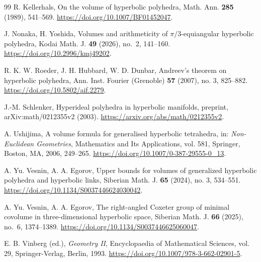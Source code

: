 \documentclass[12pt,a4paper]{article}
\theoremstyle{definition}
\begin{document}
\begin{thebibliography}{99}
R. Kellerhals,
On the volume of hyperbolic polyhedra,
Math. Ann. \textbf{285} (1989), 541--569.
\url{https://doi.org/10.1007/BF01452047}.

J. Nonaka, H. Yoshida,
Volumes and arithmeticity of \(\pi/3\)-equiangular hyperbolic polyhedra,
Kodai Math. J. \textbf{49} (2026), no.~2, 141--160.
\url{https://doi.org/10.2996/kmj49202}.

R. K. W. Roeder, J. H. Hubbard, W. D. Dunbar,
Andreev's theorem on hyperbolic polyhedra,
Ann. Inst. Fourier (Grenoble) \textbf{57} (2007), no. 3, 825--882.
\url{https://doi.org/10.5802/aif.2279}.

J.-M. Schlenker,
Hyperideal polyhedra in hyperbolic manifolds,
preprint, arXiv:math/0212355v2 (2003).
\url{https://arxiv.org/abs/math/0212355v2}.

A. Ushijima,
A volume formula for generalised hyperbolic tetrahedra,
in: \emph{Non-Euclidean Geometries}, Mathematics and Its Applications, vol. 581,
Springer, Boston, MA, 2006, 249--265.
\url{https://doi.org/10.1007/0-387-29555-0_13}.

A. Yu. Vesnin, A. A. Egorov,
Upper bounds for volumes of generalized hyperbolic polyhedra and hyperbolic links,
Siberian Math. J. \textbf{65} (2024), no. 3, 534--551.
\url{https://doi.org/10.1134/S0037446624030042}.

A. Yu. Vesnin, A. A. Egorov,
The right-angled Coxeter group of minimal covolume in three-dimensional hyperbolic space,
Siberian Math. J. \textbf{66} (2025), no.~6, 1374--1389.
\url{https://doi.org/10.1134/S0037446625060047}.

E. B. Vinberg (ed.),
\emph{Geometry II}, Encyclopaedia of Mathematical Sciences, vol. 29,
Springer-Verlag, Berlin, 1993.
\url{https://doi.org/10.1007/978-3-662-02901-5}.

\end{thebibliography}
\end{document}
